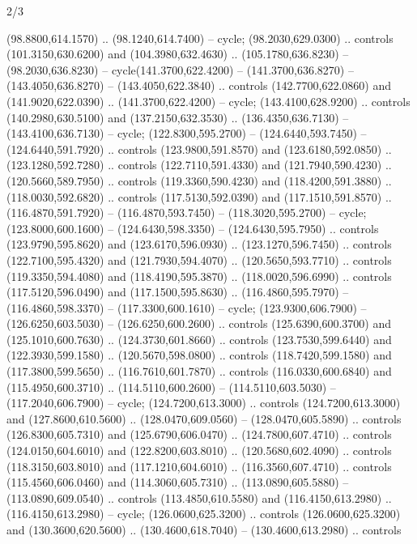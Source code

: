 \begin{flagdescription}{2/3}
\begin{scope} [xshift=0.5\flaglength,yshift=\flagwidth/3.75]
\begin{scope}[y=-\flagwidth/358, x=\flagwidth/346,xshift=-0.565\flagwidth,
   yshift=2.0084\flagwidth]
\begin{scope}[draw=black,fill=white,line width=0.768\lw]
\begin{scope}[cm={{-1.0,0.0,0.0,1.0,(390.74,0.0)}}]
  (98.8800,614.1570) .. (98.1240,614.7400) -- cycle;
 (98.2030,629.0300) .. controls (101.3150,630.6200) and
  (104.3980,632.4630) .. (105.1780,636.8230) -- (98.2030,636.8230) --
  cycle(141.3700,622.4200) -- (141.3700,636.8270) -- (143.4050,636.8270) --
  (143.4050,622.3840) .. controls (142.7700,622.0860) and (141.9020,622.0390) ..
  (141.3700,622.4200) -- cycle;
 (143.4100,628.9200) .. controls (140.2980,630.5100) and
  (137.2150,632.3530) .. (136.4350,636.7130) -- (143.4100,636.7130) -- cycle;
 (122.8300,595.2700) -- (124.6440,593.7450) --
  (124.6440,591.7920) .. controls (123.9800,591.8570) and (123.6180,592.0850) ..
  (123.1280,592.7280) .. controls (122.7110,591.4330) and (121.7940,590.4230) ..
  (120.5660,589.7950) .. controls (119.3360,590.4230) and (118.4200,591.3880) ..
  (118.0030,592.6820) .. controls (117.5130,592.0390) and (117.1510,591.8570) ..
  (116.4870,591.7920) -- (116.4870,593.7450) -- (118.3020,595.2700) -- cycle;
 (123.8000,600.1600) -- (124.6430,598.3350) --
  (124.6430,595.7950) .. controls (123.9790,595.8620) and (123.6170,596.0930) ..
  (123.1270,596.7450) .. controls (122.7100,595.4320) and (121.7930,594.4070) ..
  (120.5650,593.7710) .. controls (119.3350,594.4080) and (118.4190,595.3870) ..
  (118.0020,596.6990) .. controls (117.5120,596.0490) and (117.1500,595.8630) ..
  (116.4860,595.7970) -- (116.4860,598.3370) -- (117.3300,600.1610) -- cycle;
 (123.9300,606.7900) -- (126.6250,603.5030) --
  (126.6250,600.2600) .. controls (125.6390,600.3700) and (125.1010,600.7630) ..
  (124.3730,601.8660) .. controls (123.7530,599.6440) and (122.3930,599.1580) ..
  (120.5670,598.0800) .. controls (118.7420,599.1580) and (117.3800,599.5650) ..
  (116.7610,601.7870) .. controls (116.0330,600.6840) and (115.4950,600.3710) ..
  (114.5110,600.2600) -- (114.5110,603.5030) -- (117.2040,606.7900) -- cycle;
 (124.7200,613.3000) .. controls (124.7200,613.3000) and
  (127.8600,610.5600) .. (128.0470,609.0560) -- (128.0470,605.5890) .. controls
  (126.8300,605.7310) and (125.6790,606.0470) .. (124.7800,607.4710) .. controls
  (124.0150,604.6010) and (122.8200,603.8010) .. (120.5680,602.4090) .. controls
  (118.3150,603.8010) and (117.1210,604.6010) .. (116.3560,607.4710) .. controls
  (115.4560,606.0460) and (114.3060,605.7310) .. (113.0890,605.5880) --
  (113.0890,609.0540) .. controls (113.4850,610.5580) and (116.4150,613.2980) ..
  (116.4150,613.2980) -- cycle;
 (126.0600,625.3200) .. controls (126.0600,625.3200) and
  (130.3600,620.5600) .. (130.4600,618.7040) -- (130.4600,613.2980) .. controls

\end{scope}
\end{scope}
\end{scope}
\end{scope}
\end{flagdescription}
